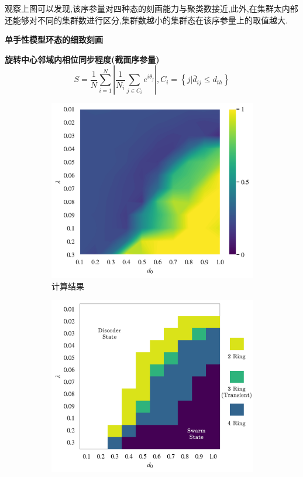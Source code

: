 \documentclass{article}
\begin{document}
观察上图可以发现,该序参量对四种态的刻画能力与聚类数接近,此外,在集群太内部还能够对不同的集群数进行区分,集群数越小的集群态在该序参量上的取值越大.

\newpage
\noindent\textbf{\large 单手性模型环态的细致刻画}

\noindent\textbf{旋转中心邻域内相位同步程度(截面序参量)}
$$
S=\frac{1}{N}\sum_{i=1}^N{\left| \frac{1}{N_i}\sum_{j\in C_i}{e^{i\theta _j}} \right|}, C_i=\left\{ j|\bar{d}_{ij}\le d_{th} \right\} 
$$
\vspace{-0.5cm}
\begin{figure}[H]
	\centering
	\begin{subfigure}[b]{0.49\textwidth}
		\includegraphics[width=\textwidth]{./figs/limitDisPhaseSyncRing.png}
		\vspace{-1cm}
		\caption{计算结果}
	\end{subfigure}
	\begin{subfigure}[b]{0.49\textwidth}
		\includegraphics[width=\textwidth]{./figs/subjectiveOpRing.png}

\end{subfigure}
\end{figure}
\end{document}

